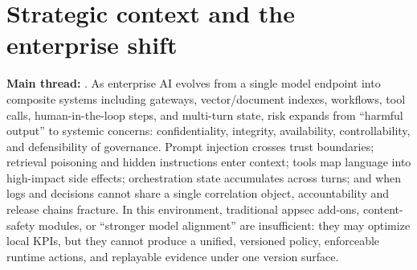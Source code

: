 \documentclass[11pt,a4paper]{report}
\begin{document}

\section{Strategic context and the enterprise shift}
\textbf{Main thread:} \ControlPlane{}. As enterprise AI evolves from a single model endpoint into composite systems including gateways, vector/document indexes, workflows, tool calls, human-in-the-loop steps, and multi-turn state, risk expands from “harmful output” to systemic concerns: confidentiality, integrity, availability, controllability, and defensibility of governance. Prompt injection crosses trust boundaries; retrieval poisoning and hidden instructions enter context; tools map language into high-impact side effects; orchestration state accumulates across turns; and when logs and decisions cannot share a single correlation object, accountability and release chains fracture. In this environment, traditional appsec add-ons, content-safety modules, or “stronger model alignment” are insufficient: they may optimize local KPIs, but they cannot produce a unified, versioned policy, enforceable runtime actions, and replayable evidence under one version surface.
\end{document}
